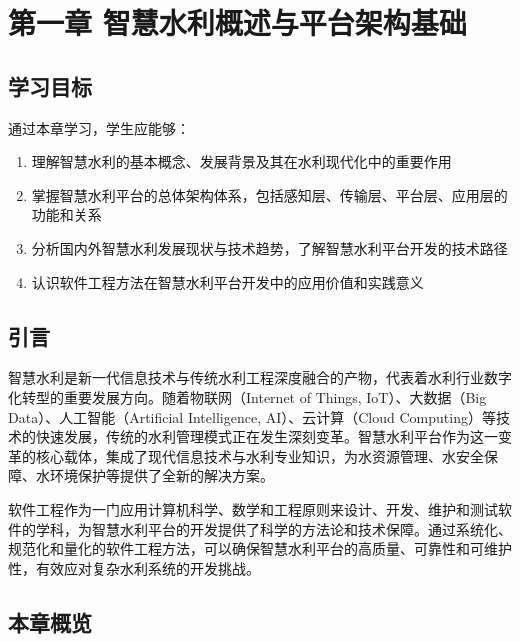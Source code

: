\documentclass[12pt,a4paper]{ctexbook}
\providecommand{\tightlist}{%
  \setlength{\itemsep}{0pt}\setlength{\parskip}{0pt}}
\begin{document}
\chapter{第一章
智慧水利概述与平台架构基础}\label{ux7b2cux4e00ux7ae0-ux667aux6167ux6c34ux5229ux6982ux8ff0ux4e0eux5e73ux53f0ux67b6ux6784ux57faux7840}

\section{学习目标}\label{ux5b66ux4e60ux76eeux6807}

通过本章学习，学生应能够：

\begin{enumerate}
\def\labelenumi{\arabic{enumi}.}
\tightlist
\item
  理解智慧水利的基本概念、发展背景及其在水利现代化中的重要作用
\item
  掌握智慧水利平台的总体架构体系，包括感知层、传输层、平台层、应用层的功能和关系
\item
  分析国内外智慧水利发展现状与技术趋势，了解智慧水利平台开发的技术路径
\item
  认识软件工程方法在智慧水利平台开发中的应用价值和实践意义
\end{enumerate}

\section{引言}\label{ux5f15ux8a00}

智慧水利是新一代信息技术与传统水利工程深度融合的产物，代表着水利行业数字化转型的重要发展方向。随着物联网（Internet
of Things, IoT）、大数据（Big Data）、人工智能（Artificial Intelligence,
AI）、云计算（Cloud
Computing）等技术的快速发展，传统的水利管理模式正在发生深刻变革。智慧水利平台作为这一变革的核心载体，集成了现代信息技术与水利专业知识，为水资源管理、水安全保障、水环境保护等提供了全新的解决方案。

软件工程作为一门应用计算机科学、数学和工程原则来设计、开发、维护和测试软件的学科，为智慧水利平台的开发提供了科学的方法论和技术保障。通过系统化、规范化和量化的软件工程方法，可以确保智慧水利平台的高质量、可靠性和可维护性，有效应对复杂水利系统的开发挑战。

\section{本章概览}\label{ux672cux7ae0ux6982ux89c8}
\end{document}
